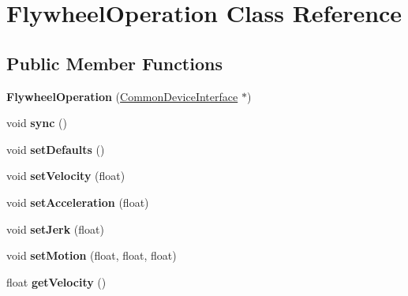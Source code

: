 \hypertarget{class_flywheel_operation}{}\section{Flywheel\+Operation Class Reference}
\label{class_flywheel_operation}
\subsection*{Public Member Functions}
\begin{DoxyCompactItemize}
\item 
\hypertarget{class_flywheel_operation_aca3144bf0bb443aaa8a2779624d2a5b2}{}\label{class_flywheel_operation_aca3144bf0bb443aaa8a2779624d2a5b2} 
{\bfseries Flywheel\+Operation} (\hyperlink{class_common_device_interface}{Common\+Device\+Interface} $\ast$)
\item 
\hypertarget{class_flywheel_operation_a61df04a204188bd187ce68f9d610e78a}{}\label{class_flywheel_operation_a61df04a204188bd187ce68f9d610e78a} 
void {\bfseries sync} ()
\item 
\hypertarget{class_flywheel_operation_a23b72640fdedd6d89575ea9a4ef3c69a}{}\label{class_flywheel_operation_a23b72640fdedd6d89575ea9a4ef3c69a} 
void {\bfseries set\+Defaults} ()
\item 
\hypertarget{class_flywheel_operation_a30e26868333a6a7d73ae34156ba432a8}{}\label{class_flywheel_operation_a30e26868333a6a7d73ae34156ba432a8} 
void {\bfseries set\+Velocity} (float)
\item 
\hypertarget{class_flywheel_operation_a307929c750339cb2b46baaafa526d29f}{}\label{class_flywheel_operation_a307929c750339cb2b46baaafa526d29f} 
void {\bfseries set\+Acceleration} (float)
\item 
\hypertarget{class_flywheel_operation_a4f14dfe672793f37e21f90ecab499378}{}\label{class_flywheel_operation_a4f14dfe672793f37e21f90ecab499378} 
void {\bfseries set\+Jerk} (float)
\item 
\hypertarget{class_flywheel_operation_a9bcbe2d59c2a14c08b9b34d2e0c63023}{}\label{class_flywheel_operation_a9bcbe2d59c2a14c08b9b34d2e0c63023} 
void {\bfseries set\+Motion} (float, float, float)
\item 
\hypertarget{class_flywheel_operation_a06119af2250971d23869d94fd451ceba}{}\label{class_flywheel_operation_a06119af2250971d23869d94fd451ceba} 
float {\bfseries get\+Velocity} ()
\item 
\hypertarget{class_flywheel_operation_a23310ab41f29ee3d510c2d412fde801b}{}\label{class_flywheel_operation_a23310ab41f29ee3d510c2d412fde801b} 

\end{DoxyCompactItemize}

